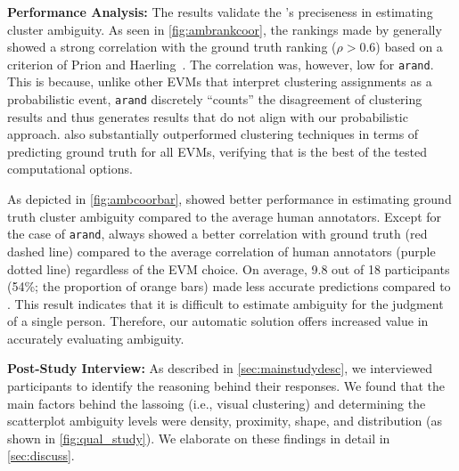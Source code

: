 \label{sec:mainstudyresults}

\noindent
\textbf{Performance Analysis:}
The results validate the \measure's preciseness in estimating cluster ambiguity.
As seen in \autoref{fig:ambrankcoor}, the rankings made by \measure generally showed a strong correlation with the ground truth ranking ($\rho > 0.6$) based on a criterion of Prion and Haerling~\cite{prion14csn}. 
The correlation was, however, low for \texttt{arand}. 
This is because, unlike other EVMs that interpret clustering assignments as a probabilistic event, \texttt{arand} discretely ``counts'' the disagreement of clustering results and thus generates results that do not align with our probabilistic approach.
\measure also substantially outperformed clustering techniques in terms of predicting ground truth for all EVMs, verifying that \measure is the best of the tested computational options. 

As depicted in \autoref{fig:ambcoorbar}, 
\measure showed better performance in estimating ground truth cluster ambiguity compared to the average human annotators. 
Except for the case of \texttt{arand}, \measure always showed a better correlation with ground truth (red dashed line) compared to the average correlation of human annotators (purple dotted line) regardless of the EVM choice.
On average, 9.8 out of 18 participants (54\%; the proportion of orange bars) made less accurate predictions compared to \measure.
This result indicates that it is difficult to estimate ambiguity for the judgment of a single person. Therefore, our automatic solution offers increased value in accurately evaluating ambiguity.


\noindent
\textbf{Post-Study Interview:}
As described in \autoref{sec:mainstudydesc}, we interviewed participants 
to identify the reasoning behind their responses. We found that the main factors behind the lassoing (i.e., visual clustering) and determining the scatterplot ambiguity levels were density, proximity, shape, and distribution (as shown in \autoref{fig:qual_study}). We elaborate on these findings in detail in \autoref{sec:discuss}.


